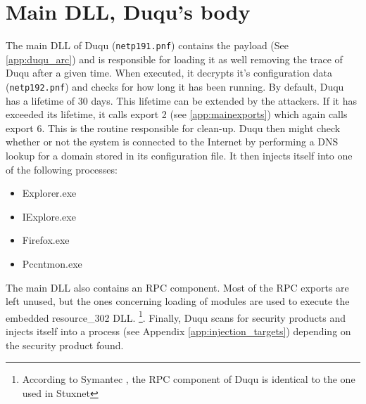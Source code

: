 \documentclass[11pt,english,a4paper]{report}
\begin{document}
\section{Main DLL, Duqu's body}
The main DLL of Duqu (\texttt{netp191.pnf}) contains the payload (See \ref{app:duqu_arc}) and is responsible for loading it as well removing the trace of Duqu after a given time. When executed, it decrypts it's configuration data (\texttt{netp192.pnf}) and checks for how long it has been running. By default, Duqu has a lifetime of 30 days. This lifetime can be extended by the attackers. If it has exceeded its lifetime, it calls export 2 (see \ref{app:mainexports}) which again calls export 6. This is the routine responsible for clean-up. Duqu then might check whether or not the system is connected to the Internet by performing a DNS lookup for a domain stored in its configuration file. It then injects itself into one of the following processes:
 \begin{itemize}
   \item Explorer.exe
   \item IExplore.exe
   \item Firefox.exe
   \item Pccntmon.exe
  \end{itemize}
The main DLL also contains an RPC component. Most of the RPC exports are left unused, but the ones concerning loading of modules are used to execute the embedded resource\_302 DLL. \footnote{ According to Symantec \cite{DUQU_SYMANTEC}, the RPC component of Duqu is identical to the one used in Stuxnet}. Finally, Duqu scans for security products and injects itself into a process (see Appendix \ref{app:injection_targets}) depending on the security product found. 
\end{document}
